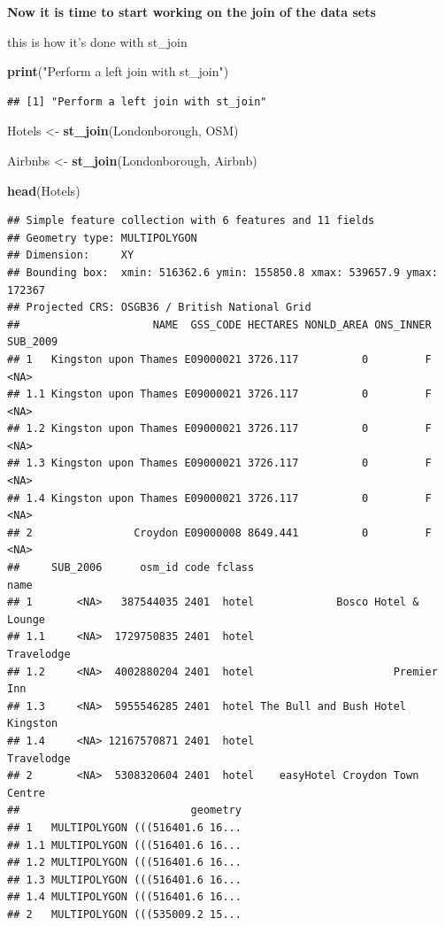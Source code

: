 \documentclass[
]{article}
\newenvironment{Shaded}{\begin{snugshade}}{\end{snugshade}}
\newcommand{\FunctionTok}[1]{\textcolor[rgb]{0.13,0.29,0.53}{\textbf{#1}}}
\newcommand{\NormalTok}[1]{#1}
\newcommand{\OtherTok}[1]{\textcolor[rgb]{0.56,0.35,0.01}{#1}}
\newcommand{\StringTok}[1]{\textcolor[rgb]{0.31,0.60,0.02}{#1}}
\begin{document}
\textbf{Now it is time to start working on the join of the data sets}

this is how it's done with st\_join

\begin{Shaded}
\begin{Highlighting}[]
\FunctionTok{print}\NormalTok{(}\StringTok{"Perform a left join with st\_join"}\NormalTok{)}
\end{Highlighting}
\end{Shaded}

\begin{verbatim}
## [1] "Perform a left join with st_join"
\end{verbatim}

\begin{Shaded}
\begin{Highlighting}[]
\NormalTok{Hotels }\OtherTok{\textless{}{-}}  \FunctionTok{st\_join}\NormalTok{(Londonborough, OSM)}

\NormalTok{Airbnbs }\OtherTok{\textless{}{-}}  \FunctionTok{st\_join}\NormalTok{(Londonborough, Airbnb)}

\FunctionTok{head}\NormalTok{(Hotels)}
\end{Highlighting}
\end{Shaded}

\begin{verbatim}
## Simple feature collection with 6 features and 11 fields
## Geometry type: MULTIPOLYGON
## Dimension:     XY
## Bounding box:  xmin: 516362.6 ymin: 155850.8 xmax: 539657.9 ymax: 172367
## Projected CRS: OSGB36 / British National Grid
##                     NAME  GSS_CODE HECTARES NONLD_AREA ONS_INNER SUB_2009
## 1   Kingston upon Thames E09000021 3726.117          0         F     <NA>
## 1.1 Kingston upon Thames E09000021 3726.117          0         F     <NA>
## 1.2 Kingston upon Thames E09000021 3726.117          0         F     <NA>
## 1.3 Kingston upon Thames E09000021 3726.117          0         F     <NA>
## 1.4 Kingston upon Thames E09000021 3726.117          0         F     <NA>
## 2                Croydon E09000008 8649.441          0         F     <NA>
##     SUB_2006      osm_id code fclass                             name
## 1       <NA>   387544035 2401  hotel             Bosco Hotel & Lounge
## 1.1     <NA>  1729750835 2401  hotel                       Travelodge
## 1.2     <NA>  4002880204 2401  hotel                      Premier Inn
## 1.3     <NA>  5955546285 2401  hotel The Bull and Bush Hotel Kingston
## 1.4     <NA> 12167570871 2401  hotel                       Travelodge
## 2       <NA>  5308320604 2401  hotel    easyHotel Croydon Town Centre
##                           geometry
## 1   MULTIPOLYGON (((516401.6 16...
## 1.1 MULTIPOLYGON (((516401.6 16...
## 1.2 MULTIPOLYGON (((516401.6 16...
## 1.3 MULTIPOLYGON (((516401.6 16...
## 1.4 MULTIPOLYGON (((516401.6 16...
## 2   MULTIPOLYGON (((535009.2 15...
\end{verbatim}
\end{document}
